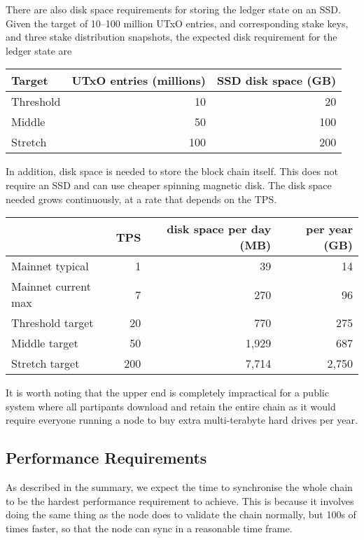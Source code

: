 \documentclass[11pt,a4paper]{article}
\begin{document}
There are also disk space requirements for storing the ledger state on an SSD.
Given the target of 10--100 million UTxO entries, and corresponding stake keys,
and three stake distribution snapshots, the expected disk requirement for the
ledger state are
\begin{center}
\begin{tabular}[]{lrr}
  Target  & UTxO entries (millions) & SSD disk space (GB) \\
  \toprule
  Threshold &  10  &  20 \\
  Middle    &  50  & 100 \\
  Stretch   & 100  & 200
\end{tabular}
\end{center}
In addition, disk space is needed to store the block chain itself. This does
not require an SSD and can use cheaper spinning magnetic disk. The disk space
needed grows continuously, at a rate that depends on the TPS.
\begin{center}
\begin{tabular}[]{lrrr}
                      & TPS & disk space per day (MB) & per year (GB) \\
  \toprule
  Mainnet typical     &   1 &    39 &    14 \\
  Mainnet current max &   7 &   270 &    96 \\
  Threshold target    &  20 &   770 &   275 \\
  Middle target       &  50 & 1,929 &   687 \\
  Stretch target      & 200 & 7,714 & 2,750
\end{tabular}
\end{center}
It is worth noting that the upper end is completely impractical for a public
system where all partipants download and retain the entire chain as it would
require everyone running a node to buy extra multi-terabyte hard drives per
year.

\subsection{Performance Requirements}
\label{performance-requirements}

As described in the summary, we expect the time to synchronise the whole chain
to be the hardest performance requirement to achieve. This is because it
involves doing the same thing as the node does to validate the chain normally,
but 100s of times faster, so that the node can sync in a reasonable time frame.
\end{document}
